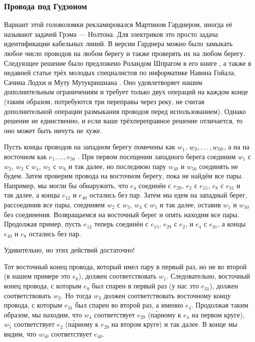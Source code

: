 \subsubsection*{Провода под Гудзоном}

Вариант этой головоломки рекламировался Мартином Гарднером,
иногда её называют задачей Грэма --- Нолтона.
Для электриков это просто задача идентификации кабельных линий.
В версии Гарднера можно было замыкать любое число проводов на любом берегу и также проверять их на любом берегу.
Следующее решение было предложено Роландом Шпрагом в его книге \cite{54}, а также в недавней статье трёх молодых специалистов по информатике Навина Гойала, Сачина Лодхи и Муту Мутукришнана \cite{33}.
Оно удовлетворяет нашим дополнительным ограничениям и требует только двух операций на каждом конце (таким образом, потребуются три переправы через реку, не считая дополнительной операции размыкания проводов перед использованием).
Однако решение не единственно, и если ваше трёхпереправное решение отличается, то оно может быть ничуть не хуже.

Пусть концы проводов на западном берегу помечены как $w_1$, $w_2, \z\dots, w_{50}$,
а на на восточном как $e_1, \dots, e_{50}$ .
При первом посещении западного берега соединим $w_1$ с $w_2$, $w_3$ с $w_4$, $w_5$ с $w_6$ и так далее, но последнюю пару $w_{49}$ и $w_{50}$ соединять не будем.
Затем проверим провода на восточном берегу, пока не найдём все пары.
Например, мы могли бы обнаружить, что $e_4$ соединён с $e_{29}$, $e_2$ с $e_{15}$, $e_8$ с $e_{31}$ и так далее, а концы $e_{12}$ и $e_{40}$ остались без пар.
Затем мы едем на западный берег, рассоединив все пары, соединяем $w_2$ с $w_3$, $w_4$ с $w_5$ и так далее, оставив $w_1$ и $w_{50}$ без соединения.
Возвращаемся на восточный берег и опять находим все пары.
Продолжая пример, пусть $e_{12}$ теперь соединён с $e_{15}$, $e_{29}$ с $e_2$, и $e_4$ с $e_{31}$, а концы $e_{40}$ и $e_8$ остались без пар.

Удивительно, но этих действий достаточно!

Тот восточный конец провода, который имел пару в первый раз, но не во второй (в нашем примере это $e_8$), должен соответствовать $w_1$.
Следовательно, восточный конец провода, с которым $e_8$ был спарен в первый раз (у нас это $e_{31}$), должен соответствовать $w_2$.
Но тогда $w_3$ должен соответствовать восточному концу провода, с которым $e_{31}$ был спарен во второй раз, а именно $e_4$.
Продолжая таким образом, мы находим, что $w_4$ соответствует $e_{29}$ (п\'{а}рному к $e_4$ на первом круге), $w_5$ соответствует $e_2$ (п\'{а}рному к $e_{29}$ на втором круге) и так далее. В конце мы видим, что $w_{50}$ соответствует $e_{40}$.


